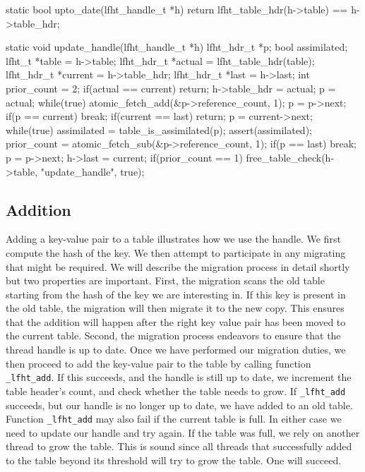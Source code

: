 \begin{center}
\begin{clisting}
static bool upto_date(lfht_handle_t *h){
  return lfht_table_hdr(h->table) == h->table_hdr;
}

static void update_handle(lfht_handle_t *h){
  lfht_hdr_t *p;
  bool assimilated;
  lfht_t *table = h->table;
  lfht_hdr_t *actual = lfht_table_hdr(table);
  lfht_hdr_t *current  = h->table_hdr;
  lfht_hdr_t *last = h->last;
  int prior_count = 2;
  if(actual == current){
    return;
  }
  h->table_hdr = actual;
  p = actual;
  while(true){
    atomic_fetch_add(&p->reference_count, 1);
    p = p->next;
    if(p == current){ break; }
  }
  if(current == last){  return; }
  p = current->next;
  while(true){
    assimilated = table_is_assimilated(p);
    assert(assimilated);
    prior_count = atomic_fetch_sub(&p->reference_count, 1);
    if(p == last){ break; }
    p = p->next;
  }
  h->last = current;
  if(prior_count == 1){
    free_table_check(h->table, "update_handle", true);
  }
}
\end{clisting}
\end{center}

\subsection{Addition}

Adding a key-value pair to a table illustrates how we use the
handle. We first compute the hash of the key. We then attempt to
participate in any migrating that might be required. We will describe
the migration process in detail shortly but two properties are
important.  First, the migration scans the old table starting from the
hash of the key we are interesting in. If this key is present in the
old table, the migration will then migrate it to the new copy. This
ensures that the addition will happen after the right key value pair
has been moved to the current table. Second, the migration process
endeavors to ensure that the thread handle is up to date.  Once we
have performed our migration duties, we then proceed to add the
key-value pair to the table by calling function \texttt{\_lfht\_add}.
If this succeeds, and the handle is still up to date, we increment the
table header's count, and check whether the table needs to grow.  If
\texttt{\_lfht\_add} succeeds, but our handle is no longer up to date,
we have added to an old table. Function \texttt{\_lfht\_add} may also fail
if the current table is full.
In either case we need to update our handle and try again. If the
table was full, we rely on another thread to grow the table. This is
sound since all threads that successfully added to the table beyond
its threshold will try to grow the table. One will succeed.

